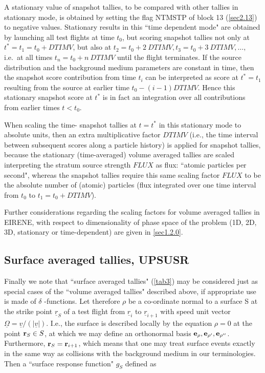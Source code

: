 A stationary value of snapshot tallies, to be compared with other tallies in
stationary mode, is obtained by setting the flag NTMSTP of block 13
(\cref{sec2.13}) to negative values.
Stationary results in this ``time dependent mode" are obtained by launching all
test flights at time $t_0$, but scoring snapshot tallies not only at
$t^*=t_1=t_0+DTIMV$, but also at $t_2=t_0+2~ DTIMV, t_3=t_0+3~ DTIMV, \dots,$
i.e.\ at all times $t_n=t_0+n~ DTIMV$ until the flight terminates.
If the source distribution and the background medium parameters are constant in
time, then the snapshot score contribution from time $t_i$ can be interpreted
as score at $t^*=t_1$ resulting from the source at earlier time $t_0-(i-1)
  DTIMV$.
Hence this stationary snapshot score at $t^*$ is in fact an integration over
all contributions from earlier times $t < t_0$.

When scaling the time- snapshot tallies at $t=t^*$ in this stationary mode to
absolute units, then an extra multiplicative factor $DTIMV$ (i.e., the time
interval between subsequent scores along a particle history) is applied for
snapshot tallies, because the stationary (time-averaged) volume averaged
tallies are scaled interpreting the stratum source strength $FLUX$ as flux:
``atomic particles per second", whereas the snapshot tallies require this same
scaling factor $FLUX$ to be the absolute number of (atomic) particles (flux
integrated over one time interval from $t_0$ to $t_1=t_0+DTIMV$).

Further considerations regarding the scaling factors for volume averaged
tallies in EIRENE, with respect to dimensionality of phase space of the problem
(1D, 2D, 3D, stationary or time-dependent) are given in \cref{sec1.2.0}.

\subsection{Surface averaged tallies, UPSUSR}\label{sec3.2.4}

\medskip

Finally we note that ``surface averaged tallies" (\cref{tab3}) may be
considered just as special cases of the ``volume averaged tallies" described
above, if appropriate use is made of $\delta$ -functions.
Let therefore $\rho$ be a co-ordinate normal to a surface S at the strike point
$\underline{r}_S$ of a test flight from $\underline{r}_i$ to
$\underline{r}_{i+1}$ with speed unit vector $\underline{\Omega} =
  \underline{v}  / (| \underline{v} |)$.
I.e., the surface is described locally by the equation $\rho=0$ at the point
$\mathbf{r}_S \in S$, at which we may define an orthonormal basis $ \mathbf{e}_{\rho}, \mathbf{e}_
  {\rho'}, \mathbf{e}_{\rho''}$.
Furthermore, $\mathbf{r}_S = \mathbf{r}_{i+1} $, which means that one may treat surface
events exactly in the same way as collisions with the background medium in our
terminologies.
Then a ``surface response function" $ g_S $ defined as 

